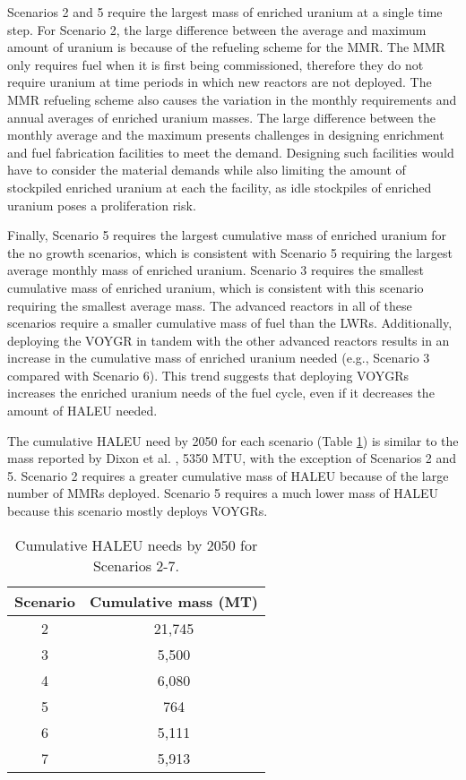 Scenarios 2 and 5 require the largest mass of enriched uranium at a single 
time step. For Scenario 2, the large difference between the average and 
maximum amount of uranium is because of the refueling scheme for the 
\gls{MMR}. The \gls{MMR} only requires fuel when it is first being 
commissioned, therefore they do not require uranium at time periods in 
which
new reactors are not deployed. The \gls{MMR} refueling scheme also 
causes the variation in the monthly requirements and annual averages of 
enriched uranium masses. The large difference between the 
monthly average and the maximum presents challenges in designing enrichment 
and fuel fabrication facilities 
to meet the demand. Designing such facilities would have to consider the 
material demands while also limiting the amount of stockpiled enriched 
uranium at each the facility, as idle stockpiles of enriched uranium 
poses a proliferation risk. 

Finally, Scenario 5 requires the largest cumulative mass of enriched uranium 
for the no growth scenarios, which is consistent with Scenario 5 requiring 
the largest average monthly mass of enriched uranium.  Scenario 3 requires 
the smallest cumulative 
mass of enriched uranium, which is consistent with this scenario requiring 
the smallest average mass. The advanced reactors 
in all of these scenarios require a smaller cumulative mass of fuel than 
the \glspl{LWR}. Additionally, deploying the VOYGR in tandem with the other 
advanced reactors results in an increase in the cumulative mass 
of enriched uranium needed (e.g., Scenario 3 compared with Scenario 6). This
trend suggests that deploying VOYGRs increases the enriched uranium needs 
of the fuel cycle, even if it decreases the amount of \gls{HALEU} needed. 

The cumulative \gls{HALEU} need by 2050 for each scenario (Table 
\ref{tab:nogrowth_haleu}) is similar to the mass reported by 
Dixon et al. \cite{dixon_estimated_2022}, 5350 MTU, with the exception 
of Scenarios 2 and 5. Scenario 2 requires a greater cumulative mass of 
\gls{HALEU} because of the large number of \glspl{MMR} deployed. Scenario 
5 requires a much lower mass of \gls{HALEU} because this scenario mostly 
deploys VOYGRs. 

\begin{table}
    \centering 
    \caption{Cumulative HALEU needs by 2050 for Scenarios 2-7.}
    \label{tab:nogrowth_haleu}
    \begin{tabular}{c c}
        \hline 
        Scenario & Cumulative mass (MT) \\
        \hline
        2 & 21,745\\
        3 & 5,500 \\
        4 & 6,080 \\
        5 & 764 \\
        6 & 5,111 \\
        7 & 5,913 \\
        \hline        
    \end{tabular}
\end{table}

